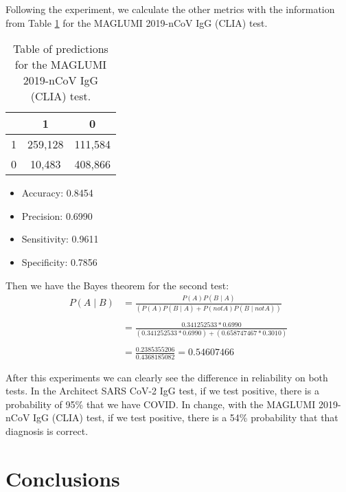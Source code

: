 \documentclass{article}
\begin{document}
Following the experiment, we calculate the other metrics with the information from Table \ref{tab3} for the MAGLUMI 2019-nCoV IgG (CLIA) test.\\

 \begin{table}[]\caption{Table of predictions for the MAGLUMI 2019-nCoV IgG (CLIA) test.}\label{tab3}
\centering
\begin{tabular}{| l | c | c |}
\hline
 & 1 & 0\\
\hline 
1&259,128 &111,584\\
\hline 
0&10,483&408,866\\
\hline
\end{tabular}
\end{table}

\begin{itemize}
\item Accuracy: 0.8454
\item Precision: 0.6990
\item Sensitivity: 0.9611
\item Specificity: 0.7856
\end{itemize}


Then we have the Bayes theorem for the second test:\\
\begin{equation}
\label{eq:bayes2}
\begin{split}
P(A \mid B)& =\frac{ P(A) P(B \mid A)} { (P(A)P(B\mid A) + P(not A) P(B \mid not A))}\\~\\
&= \frac{0.341252533* 0.6990}{(0.341252533* 0.6990) + (0.658747467 * 0.3010)}\\~\\
&=\frac{0.2385355206}{0.4368185082}=0.54607466
\end{split}
\end{equation}


After this experiments we can clearly see the difference in reliability on both tests. In the Architect SARS CoV-2 IgG test, if we test positive, there is a probability of 95\% that we have COVID. In change, with the MAGLUMI 2019-nCoV IgG (CLIA) test, if we test positive, there is a 54\% probability that that diagnosis is correct. \\

\section{Conclusions}
\end{document}
